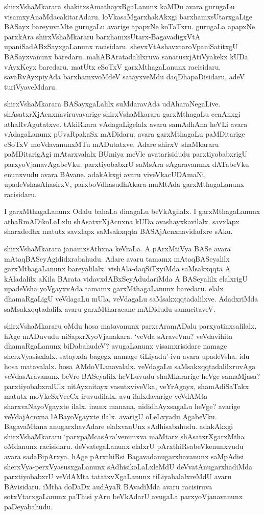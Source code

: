 shirxVshaMkarara shakitxsAmathayxRgaLanunx kaMDu avara gurugaLu visamxyAnaMdacakitarAdaru. loVkasaMgarxhakAkxgi barxhamxsUtarxgaLige BASayx bareyuvaMte gurugaLu avarige apapxNe koTaTxru. gurugaLa apapxNe parxkAra shirxVshaMkararu barxhamxsUtarx-BagavadigxVtA upaniSadABxSayxgaLanunx racisidaru. shevxVtAshavxtaroVpaniSatitxgU BASayxvanunx baredaru. mahABAratadalilxruva sanatusxjAtiVyakekx kUDa vAyxKeyx baredaru. matUtx eSoTxV garxMthagaLanunx racisidaru. savaRvAyxpiyAda barxhamxvoMdeV satayxveMdu daqDhapaDisidaru, adeV turiVyaveMdaru.

shirxVshaMkarara BASayxgaLalilx suMdaravAda udAharaNegaLive. shAsatxrXjAcnxnaviruvavarige shirxVshaMkarara garxMthagaLu cenAnxgi athaRvAgutatxve. tAkiRkara vAdagaLigelalx avaru samAdhAna heVLi avara vAdagaLanunx pUvaRpakaSx mADidaru. avara garxMthagaLu paMDitarige eSoTxV moVdavanunxMTu mADutatxve. Adare shirxV shaMkararu paMDitarigAgi mAtarxvalalx BUmiya meVle avatarisidudu parxtiyobabxrigU parxyoVjanavAgabeVku. parxtiyobabxrU saMsAra sAgaravanunx dATabeVku enunxvudu avara BAvane. adakAkxgi avaru viveVkacUDAmaNi, upadeVshasAhasirxV, parxboVdhasudhAkara muMtAda garxMthagaLanunx racisidaru.

I garxMthagaLanunx Odalu bahaLa dinagaLu beVkAgilalx. I garxMthagaLanunx athaRmADikoLaLxlu shAsatxrXjAcnxna kUDa avashayxkavilalx. savxlapx sharxdedhx matutx savxlapx saMsakxqqta BASAjAcnxnavidadxre sAku.

shirxVshaMkarara janamxsAthxna keVraLa. A pArxMtiVya BASe avara mAtaqBASeyAgididxrabahudu. Adare avaru tamamx mAtaqBASeyalilx garxMthagaLanunx bareyalilalx. vishAla-daqSiTxyiMda saMsakxqqta A kAladalilx aKila BArata vidavxdABxSeyAdudariMda A BASeyalilx elalxrigU upadeVsha yoVgayxvAda tamamx garxMthagaLanunx baredaru. elalx dhamaRgaLigU veVdagaLu mUla, veVdagaLu saMsakxqqtadalilxve. AdadxriMda saMsakxqqtadalilx avaru garxMtharacane mADidudu samucitaveV.

shirxVshaMkararu oMdu hosa matavanunx parxcAramADalu parxyatinxsalilalx. hAge mADuvudu niSapxrXyoVjanakara. `veVda sAraveVnu? veVdavihita dhamaRgaLanunx biDabahudeV? avugaLanunx visamxrisidare namage sherxVyasisxlalx. satayxda bagegx namage tiLiyadu'-ivu avara upadeVsha. idu hosa matavalalx. hosa AMdoVLanavalalx. veVdagaLu saMsakxqqtadalilxruvAga veVdasAravanunx beVre BASeyalilx heVLuvudu shaMkararige heVge samaMjasa? parxtiyobabxralUlx nitAyxnitayx vasutxviveVka, veYrAgayx, shamAdiSaTakx matutx moVkeSxVceCx iruvudilalx. avu ilalxdavarige veVdAMta sharxvaNayoVgayxte ilalx. inunx manana, nididhAyxsagaLu heVge? avarige veVdajAcnxna lABayoVgayxte ilalx. avarigU oLeLxyadu AgabeVku. BagavaMtana anugarxhavAdare elalxvanUnx sAdhisabahudu. adakAkxgi shirxVshaMkararu `parxpaMcasAra'venunxva maMtarx shAsatxrXgarxMtha oMdanunx racisidaru. deVvategaLanunx elalxrU pArxthiRsabeVkenunxvudu avara sadaBipArxya. hAge pArxthiRsi Bagavadanugarxhavanunx saMpAdisi sherxVya-perxVyasusxgaLanunx sAdhisikoLaLxleMdU deVvatAnugarxhadiMda parxtiyobabxrU veVdAMta tatatxvXgaLanunx tiLiyabalalxreMdU avaru BAvisidaru. iMtha doDaDx audAyaR BAvadiMda avaru racisiruva sotxVtarxgaLanunx paThisi yAru beVkAdarU avugaLa parxyoVjanavanunx paDeyabahudu.

